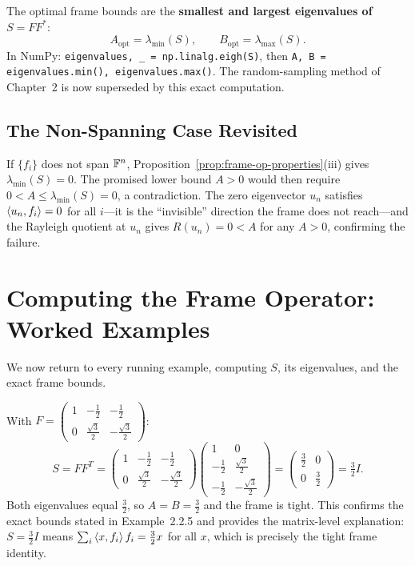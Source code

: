 \begin{keyidea}
The optimal frame bounds are the \textbf{smallest and largest eigenvalues
of} $S=FF^*$:
\[
  A_{\mathrm{opt}} = \lambda_{\min}(S),\qquad
  B_{\mathrm{opt}} = \lambda_{\max}(S).
\]
In NumPy: \texttt{eigenvalues, \_ = np.linalg.eigh(S)}, then
\texttt{A, B = eigenvalues.min(), eigenvalues.max()}.
The random-sampling method of Chapter~2 is now superseded by this exact
computation.
\end{keyidea}

\subsection{The Non-Spanning Case Revisited}
\label{subsec:nonspanning-revisited}

If $\{f_i\}$ does not span $\mathbb{F}^n$, Proposition~\ref{prop:frame-op-properties}(iii)
gives $\lambda_{\min}(S)=0$. The promised lower bound $A>0$ would then
require $0 < A\le\lambda_{\min}(S)=0$, a contradiction. The zero eigenvector
$u_n$ satisfies $\left\langle u_n, f_i \right\rangle=0$ for all $i$---it is the
``invisible'' direction the frame does not reach---and the Rayleigh
quotient at $u_n$ gives $R(u_n)=0<A$ for any $A>0$, confirming the
failure.

\section{Computing the Frame Operator: Worked Examples}
\label{sec:worked-examples}

We now return to every running example, computing $S$, its eigenvalues,
and the exact frame bounds.

\begin{examplebox}[title={Example 3.2: Triangular frame}]
\label{ex:frame-op-triangle}
With $F=\begin{pmatrix}1&-\frac12&-\frac12\\0&\frac{\sqrt3}{2}&-\frac{\sqrt3}{2}
\end{pmatrix}$:
\[
  S = FF^T
  = \begin{pmatrix}1&-\frac12&-\frac12\\0&\frac{\sqrt3}{2}&-\frac{\sqrt3}{2}\end{pmatrix}
    \begin{pmatrix}1&0\\-\frac12&\frac{\sqrt3}{2}\\-\frac12&-\frac{\sqrt3}{2}\end{pmatrix}
  = \begin{pmatrix}\frac32&0\\0&\frac32\end{pmatrix}
  = \tfrac32 I.
\]
Both eigenvalues equal $\tfrac32$, so $A=B=\tfrac32$ and the frame is
tight. This confirms the exact bounds stated in Example~2.2.5 and
provides the matrix-level explanation: $S=\tfrac32 I$ means
$\sum_i\left\langle x, f_i \right\rangle f_i = \tfrac32 x$ for all $x$, which is precisely
the tight frame identity.
\end{examplebox}

